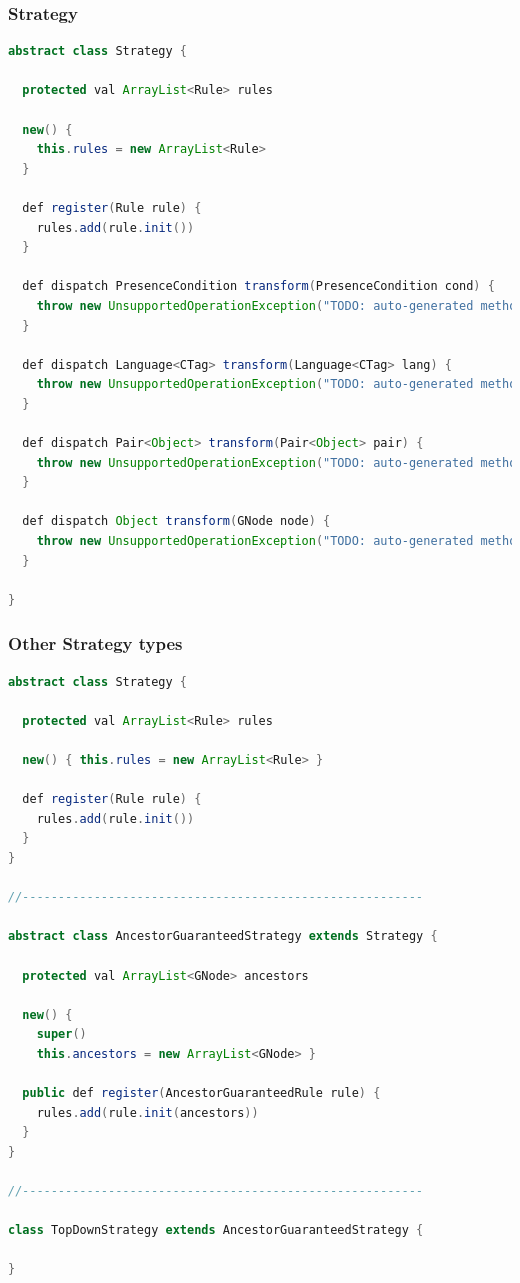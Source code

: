 \documentclass{beamer}
\begin{document}
\begin{frame}[fragile]
\frametitle{Strategy}
\begin{lstlisting}[language=java]
abstract class Strategy {

  protected val ArrayList<Rule> rules

  new() {
    this.rules = new ArrayList<Rule>
  }

  def register(Rule rule) {
    rules.add(rule.init())
  }

  def dispatch PresenceCondition transform(PresenceCondition cond) {
    throw new UnsupportedOperationException("TODO: auto-generated method stub")
  }

  def dispatch Language<CTag> transform(Language<CTag> lang) {
    throw new UnsupportedOperationException("TODO: auto-generated method stub")
  }

  def dispatch Pair<Object> transform(Pair<Object> pair) {
    throw new UnsupportedOperationException("TODO: auto-generated method stub")
  }

  def dispatch Object transform(GNode node) {
    throw new UnsupportedOperationException("TODO: auto-generated method stub")
  }

}
\end{lstlisting}
\end{frame}


\begin{frame}[fragile]
\frametitle{Other Strategy types}
\begin{lstlisting}[language=java]
abstract class Strategy {

  protected val ArrayList<Rule> rules

  new() { this.rules = new ArrayList<Rule> }

  def register(Rule rule) {
    rules.add(rule.init())
  }
}

//--------------------------------------------------------

abstract class AncestorGuaranteedStrategy extends Strategy {

  protected val ArrayList<GNode> ancestors

  new() {
    super()
    this.ancestors = new ArrayList<GNode> }

  public def register(AncestorGuaranteedRule rule) {
    rules.add(rule.init(ancestors))
  }
}

//--------------------------------------------------------

class TopDownStrategy extends AncestorGuaranteedStrategy {

}
\end{lstlisting}
\end{frame}
\end{document}
